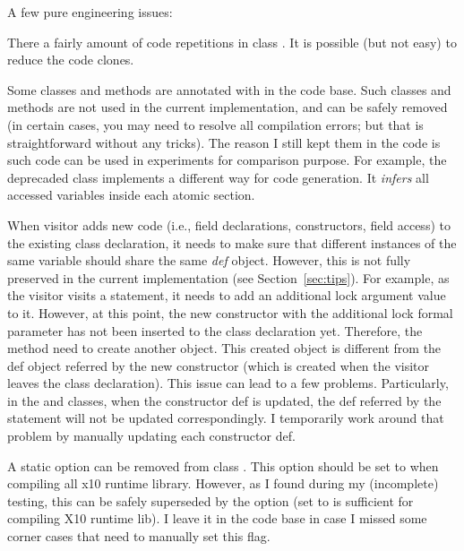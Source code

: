 \documentclass{article}
\begin{document}
\begin{enumerate}
\Item A few pure engineering issues:

\begin{itemize}
\Item There a  fairly amount of code repetitions in class . It is possible (but not easy) to reduce the code clones.

\Item Some classes and methods are annotated with   in the code base. Such classes and methods are not used in the current implementation, and can be safely removed (in certain cases, you may need to resolve all compilation errors; but that is straightforward without any tricks). The reason I still kept them in the code is such code can be used in experiments for comparison purpose. For example, the deprecaded class  implements a different way for code generation. It \textit{infers} all accessed variables inside each atomic section.

\Item When visitor  adds new code (i.e., field declarations, constructors, field access) to the existing class declaration,  it needs to make sure that different instances of the same variable should share the same \textit{def} object. However, this is not fully preserved in the current implementation (see Section~\ref{sec:tips}). For example, as the visitor  visits  a  statement, it needs to add an additional lock argument value to it. However, at this point, the new constructor with the additional lock formal parameter has not been inserted to the class declaration yet. Therefore, the  method need to create another  object. This created  object is different from the def object referred by the new constructor (which is created when the visitor leaves the class declaration). This issue can lead to a few problems. Particularly, in the  and   classes, when the constructor def is updated, the def referred by the  statement will not be updated correspondingly. I temporarily work around that problem by manually updating each constructor def.

\Item A static option  can be removed from class . This option should be set to  when compiling all x10 runtime library.  However, as I found during my (incomplete) testing, this  can be safely superseded by the  option (set  to  is sufficient for compiling X10 runtime lib). I leave it in the code base in case I missed some corner cases that need to manually set this flag.
\end{itemize}


\end{enumerate}
\end{document}

